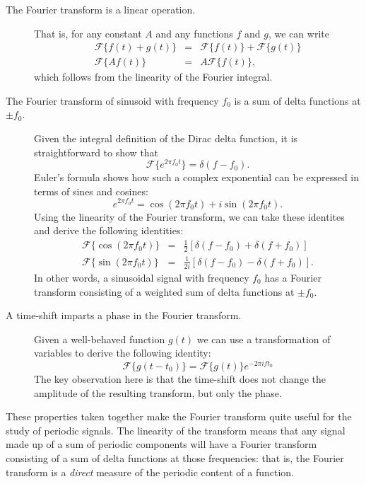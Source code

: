 \documentclass[preprint]{aastex}
\newcommand{\eqlabel}[1]{\label{eq:#1}}
\begin{document}
\begin{description}
   \item[The Fourier transform is a linear operation.]
     That is, for any constant $A$ and any functions $f$ and $g$, we can write
     \begin{eqnarray}
       \mathcal{F}\{f(t) + g(t)\} &=& \mathcal{F}\{f(t)\} + \mathcal{F}\{g(t)\}\nonumber\\
       \mathcal{F}\{A f(t)\} &=& A\mathcal{F}\{f(t)\},
     \end{eqnarray}
     which follows from the linearity of the Fourier integral.

   \item[The Fourier transform of sinusoid with frequency $f_0$ is a sum of delta functions at $\pm f_0$.]
     Given the integral definition of the Dirac delta function, it is straightforward to show that
     \begin{equation}
       \mathcal{F}\{e^{2\pi f_0 t}\} = \delta(f - f_0).
       \eqlabel{delta_FT}
     \end{equation}
     Euler's formula shows how such a complex exponential
     can be expressed in terms of sines and cosines:
     \begin{equation}
       e^{2\pi f_0 t} = \cos(2\pi f_0 t) + i\sin(2\pi f_0 t).
       \eqlabel{Euler_formula}
     \end{equation}
     Using the linearity of the Fourier transform, we can take these identites
     and derive the following identities:
     \begin{eqnarray}
       \mathcal{F}\{\cos(2\pi f_0 t)\} &=& \frac{1}{2}\left[\delta(f - f_0) + \delta(f + f_0)\right]\nonumber\\
       \mathcal{F}\{\sin(2\pi f_0 t)\} &=& \frac{1}{2i}\left[\delta(f - f_0) - \delta(f + f_0)\right].
     \end{eqnarray}
     In other words, a sinusoidal signal with frequency $f_0$ has a Fourier transform consisting of a weighted sum of delta functions at $\pm f_0$.

   \item[A time-shift imparts a phase in the Fourier transform.]
     Given a well-behaved function $g(t)$ we can use a transformation of
     variables to derive the following identity:
     \begin{equation}
       \mathcal{F}\{g(t - t_0)\} = \mathcal{F}\{g(t)\} e^{-2\pi i ft_0}
     \end{equation}
     The key observation here is that the time-shift does not change the
     amplitude of the resulting transform, but only the phase.
\end{description}
These properties taken together make the Fourier transform quite useful for the study of periodic signals.
The linearity of the transform means that any signal made up of a sum of periodic components will have a Fourier transform consisting of a sum of delta functions at those frequencies: that is, the Fourier transform is a {\it direct} measure of the periodic content of a function.
\end{document}
